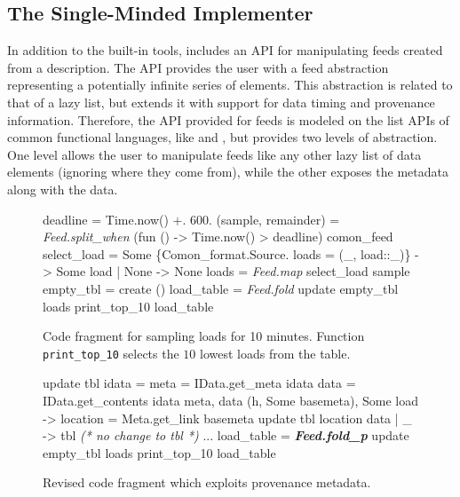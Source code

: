 

\subsection{The Single-Minded Implementer}

In addition to the built-in tools, \padsd{} includes an API for
manipulating feeds created from a description. The API provides the
user with a feed abstraction representing a potentially infinite
series of elements. This abstraction is related to that of a lazy
list, but extends it with support for data timing and provenance
information. Therefore, the API provided for feeds is modeled on the
list APIs of common functional languages, like \ocaml and \haskell,
but provides two levels of abstraction. One level allows the user to
manipulate feeds like any other lazy list of data elements (ignoring
where they come from), while the other exposes the metadata along with
the data. 


\begin{figure}[tb]
\begin{codebox}
 deadline = Time.now() +. 600. 
 (sample, remainder) = \textit{Feed.split_when} 
   (fun () -> Time.now() > deadline) comon_feed 
 select_load = 
    Some \{Comon_format.Source.
          loads = (_, load::_)\} -> Some load
  | None -> None 
 loads = \textit{Feed.map} select_load sample 
 empty_tbl = create () 
 load_table = \textit{Feed.fold} update empty_tbl loads 
 print_top_10 load_table
\end{codebox}
  \caption{Code fragment for sampling \planetlab loads for 10 minutes. Function
  \texttt{print\_top\_10} selects the $10$ lowest loads from the table.}
\label{fig:sample-loads}
\end{figure}

\begin{figure}[tb]

\begin{codebox}
 update tbl idata =
   meta = IData.get_meta idata 
   data = IData.get_contents idata 
   meta, data  
    (h, Some basemeta), Some load ->
       location = Meta.get_link basemeta 
      update tbl location data
  | _ -> tbl \textit{ (* no change to tbl *)}
 ...
 load_table = \textit{\textbf{Feed.fold_p}} update empty_tbl loads
 print_top_10 load_table
\end{codebox}
  \caption{Revised code fragment which exploits provenance metadata. }
\label{fig:sample-loads-prov}
\end{figure}

